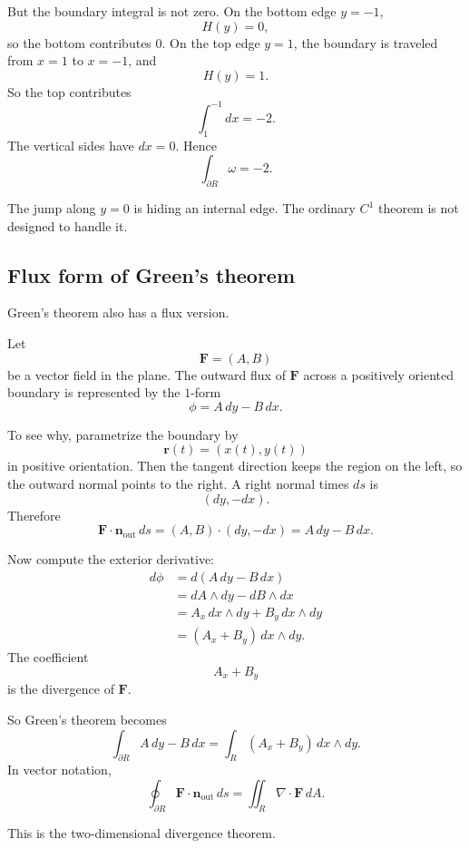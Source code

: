 But the boundary integral is not zero.  On the bottom edge \(y=-1\),
\[
    H(y)=0,
\]
so the bottom contributes \(0\).  On the top edge \(y=1\), the boundary is traveled
from \(x=1\) to \(x=-1\), and
\[
    H(y)=1.
\]
So the top contributes
\[
    \int_1^{-1} dx=-2.
\]
The vertical sides have \(dx=0\).  Hence
\[
\boxed{
    \int_{\partial R}\omega=-2.
}
\]

The jump along \(y=0\) is hiding an internal edge.  The ordinary \(C^1\) theorem is
not designed to handle it.

\subsection{Flux form of Green's theorem}

Green's theorem also has a flux version.

Let
\[
    \mathbf F=(A,B)
\]
be a vector field in the plane.  The outward flux of \(\mathbf F\) across a positively
oriented boundary is represented by the \(1\)-form
\[
\boxed{
    \phi=A\,dy-B\,dx.
}
\]

To see why, parametrize the boundary by
\[
    \mathbf r(t)=(x(t),y(t))
\]
in positive orientation.  Then the tangent direction keeps the region on the left, so the
outward normal points to the right.  A right normal times \(ds\) is
\[
    (dy,-dx).
\]
Therefore
\[
    \mathbf F\cdot\mathbf n_{\text{out}}\,ds
    =
    (A,B)\cdot(dy,-dx)
    =
    A\,dy-B\,dx.
\]

Now compute the exterior derivative:
\[
\begin{aligned}
    d\phi
    &=
    d(A\,dy-B\,dx)\\
    &=
    dA\wedge dy-dB\wedge dx\\
    &=
    A_x\,dx\wedge dy+B_y\,dx\wedge dy\\
    &=
    (A_x+B_y)\,dx\wedge dy.
\end{aligned}
\]
The coefficient
\[
    A_x+B_y
\]
is the divergence of \(\mathbf F\).

So Green's theorem becomes
\[
\boxed{
    \int_{\partial R} A\,dy-B\,dx
    =
    \int_R (A_x+B_y)\,dx\wedge dy.
}
\]
In vector notation,
\[
\boxed{
    \oint_{\partial R}\mathbf F\cdot\mathbf n_{\text{out}}\,ds
    =
    \iint_R \nabla\cdot\mathbf F\,dA.
}
\]

This is the two-dimensional divergence theorem.

